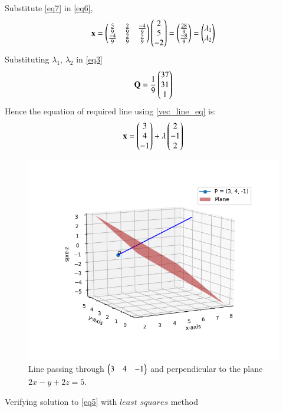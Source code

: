 \documentclass[journal,12pt,twocolumn]{IEEEtran}
\begin{document}
Substitute \eqref{eq7} in \eqref{eq6},
\begin{align}\label{eq8}
	\mathbf{x} =\begin{pmatrix}\frac{5}{9} & \frac{2}{9} & \frac{-4}{9} \\ \frac{-4}{9} & \frac{2}{9} & \frac{5}{9}\end{pmatrix}\begin{pmatrix}2\\5\\-2\end{pmatrix} = \begin{pmatrix}\frac{28}{9}\\\frac{-8}{9}\end{pmatrix} = \begin{pmatrix}\lambda_1 \\ \lambda_2\end{pmatrix}
\end{align}
Substituting $\lambda_1$, $\lambda_2$ in \eqref{eq3}
\begin{equation}
	\mathbf{Q} = \frac{1}{9}\begin{pmatrix}37\\31\\1\end{pmatrix}
\end{equation}
Hence the equation of required line using \eqref{vec_line_eq} is:
\begin{align}
     \mathbf{x} = \begin{pmatrix}3\\4\\-1\end{pmatrix} +\lambda\begin{pmatrix}2\\-1\\2\end{pmatrix} 
\end{align}
\begin{figure}[h]
    \centering
    \includegraphics[width = \columnwidth]{assignment_8.png}
    \caption{Line passing through $\begin{pmatrix}3 & 4 & -1\end{pmatrix}$ and perpendicular to the plane $2x - y + 2z = 5$.}
    \label{line and plane}
\end{figure}
\newpage
Verifying solution to \eqref{eq5} with $\textit{least squares}$ method
\end{document}
